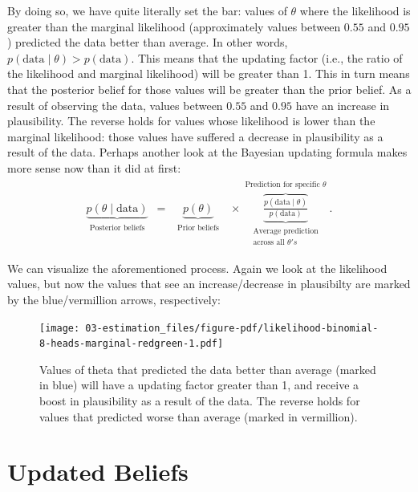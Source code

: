 \documentclass[
  letterpaper,
  DIV=11,
  numbers=noendperiod]{scrreprt}
\begin{document}
By doing so, we have quite literally set the bar: values of \(\theta\)
where the likelihood is greater than the marginal likelihood
(approximately values between \(0.55\) and \(0.95\)) predicted the data
better than average. In other words,
\(p( \text{data} \mid \theta) > p( \text{data})\). This means that the
updating factor (i.e., the ratio of the likelihood and marginal
likelihood) will be greater than 1. This in turn means that the
posterior belief for those values will be greater than the prior belief.
As a result of observing the data, values between \(0.55\) and \(0.95\)
have an increase in plausibility. The reverse holds for values whose
likelihood is lower than the marginal likelihood: those values have
suffered a decrease in plausibility as a result of the data. Perhaps
another look at the Bayesian updating formula makes more sense now than
it did at first: \begin{align}
\underbrace{ p(\theta \mid \text{data})}_{\substack{\text{Posterior beliefs}}} \,\,\, = \,\,\,
\underbrace{ p(\theta)}_{\substack{\text{Prior beliefs} }}
\,\,\,\, \times
\overbrace{\underbrace{\frac{p( \text{data} \mid \theta)}{p( \text{data})}}}^{\substack{\text{Prediction for specific }\theta }}_{\substack{\text{Average prediction} \\\text{across all }  \theta's}}.
\end{align}

We can visualize the aforementioned process. Again we look at the
likelihood values, but now the values that see an increase/decrease in
plausibilty are marked by the blue/vermillion arrows, respectively:

\begin{figure}

{\centering \texttt{[image: 03-estimation\_files/figure-pdf/likelihood-binomial-8-heads-marginal-redgreen-1.pdf]}

}

\caption{Values of theta that predicted the data better than average
(marked in blue) will have a updating factor greater than 1, and receive
a boost in plausibility as a result of the data. The reverse holds for
values that predicted worse than average (marked in vermillion).}

\end{figure}

\hypertarget{updated-beliefs}{%
\section{Updated Beliefs}\label{updated-beliefs}}
\end{document}
